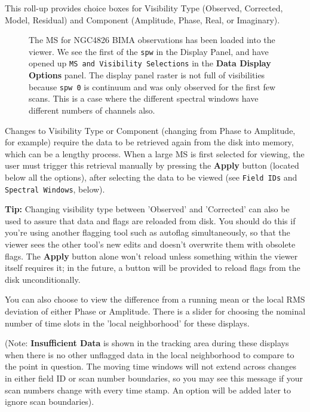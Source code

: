This roll-up provides choice boxes for Visibility Type
(Observed, Corrected, Model, Residual) and Component (Amplitude,
Phase, Real, or Imaginary).  

\begin{figure}[h!]
\begin{center}
\caption{\label{fig:viewer_axes_1} The MS for NGC4826 BIMA
observations has been loaded into the viewer.  We see the
first of the {\tt spw} in the Display Panel, and have opened
up {\tt MS and Visibility Selections} in the
{\bf Data Display Options} panel.  The display panel raster is
not full of visibilities because {\tt spw 0} is continuum and
was only observed for the first few scans.  This is a case where
the different spectral windows have different numbers of channels
also.}
\hrulefill
\end{center}
\end{figure}

Changes to Visibility Type or Component (changing from Phase to
Amplitude, for example) require the data to be retrieved again
from the disk into memory, which can be a lengthy process.  When a
large MS is first selected for viewing, the user must
trigger this retrieval manually by pressing the {\bf Apply} button
(located below all the options), after selecting the data to be
viewed (see {\tt Field IDs} and {\tt Spectral Windows}, below).

{\bf Tip:} Changing visibility type between 'Observed' and 'Corrected' can
also be used to assure that data and flags are reloaded from disk.  You
should do this if you're using another flagging tool such as autoflag
simultaneously, so that the viewer sees the other tool's new edits
and doesn't overwrite them with obsolete flags.  The {\bf Apply} button 
alone won't reload unless something within the viewer itself requires
it; in the future, a button will be provided to reload flags from the disk
unconditionally.  

You can also choose to view the difference from a running mean or the
local RMS deviation of either Phase or Amplitude.  There is a slider
for choosing the nominal number of time slots in the 'local neighborhood'
for these displays.

(Note: {\bf Insufficient Data} is shown in the tracking area during
these displays when there is no other unflagged data in the
local neighborhood to compare to the point in question.  The
moving time windows will not extend across changes in either field ID
or scan number boundaries, so you may see this message if your scan
numbers change with every time stamp.  An option will be added later
to ignore scan boundaries).

